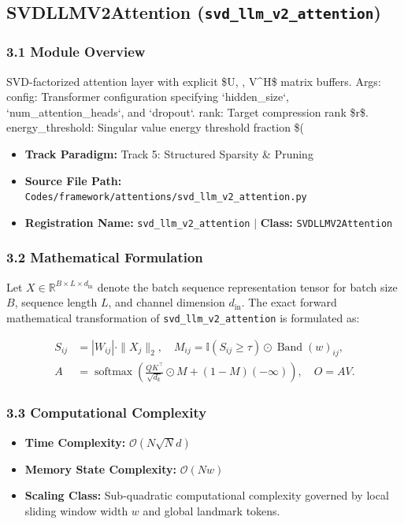 \subsection{SVDLLMV2Attention (\texttt{svd\_llm\_v2\_attention})}
\label{sec:app_module_svd_llm_v2_attention}

\subsubsection*{3.1 Module Overview}
SVD-factorized attention layer with explicit \$U, \Sigma, V^H\$ matrix buffers.  Args:     config: Transformer configuration specifying `hidden\_size`, `num\_attention\_heads`, and `dropout`.     rank: Target compression rank \$r\$.     energy\_threshold: Singular value energy threshold fraction \$\tau \in (
\begin{itemize}
    \item \textbf{Track Paradigm:} Track 5: Structured Sparsity & Pruning
    \item \textbf{Source File Path:} \texttt{Codes/framework/attentions/svd\_llm\_v2\_attention.py}
    \item \textbf{Registration Name:} \texttt{svd\_llm\_v2\_attention} $\mid$ \textbf{Class:} \texttt{SVDLLMV2Attention}
\end{itemize}

\subsubsection*{3.2 Mathematical Formulation}
Let $X \in \mathbb{R}^{B \times L \times d_{\text{in}}}$ denote the batch sequence representation tensor for batch size $B$, sequence length $L$, and channel dimension $d_{\text{in}}$. The exact forward mathematical transformation of \texttt{svd\_llm\_v2\_attention} is formulated as:

\begin{align}
S_{ij} &= |W_{ij}| \cdot \|X_j\|_2, \quad M_{ij} = \mathbb{I}(S_{ij} \ge \tau) \odot \operatorname{Band}(w)_{ij}, \\
A &= \operatorname{softmax}\left(\frac{Q K^\top}{\sqrt{d_k}} \odot M + (1 - M)(-\infty)\right), \quad O = A V.
\end{align}


\subsubsection*{3.3 Computational Complexity}
\begin{itemize}
    \item \textbf{Time Complexity:} $\mathcal{O}(N \sqrt{N} d)$
    \item \textbf{Memory State Complexity:} $\mathcal{O}(N w)$
    \item \textbf{Scaling Class:} Sub-quadratic computational complexity governed by local sliding window width $w$ and global landmark tokens.
\end{itemize}

